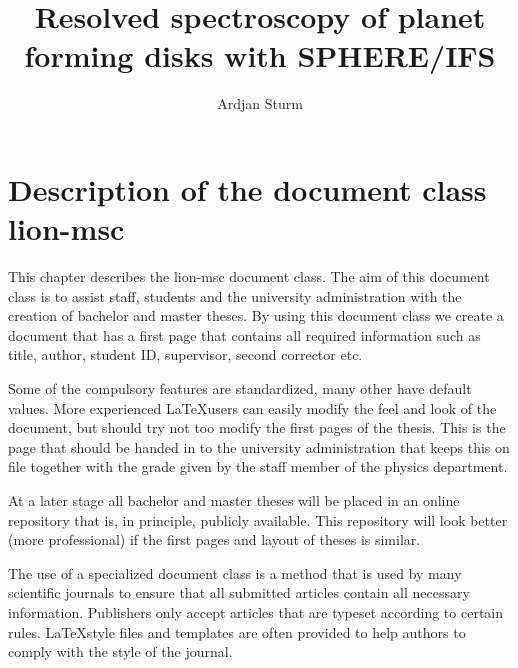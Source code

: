 \documentclass[twoside,single]{lion-msc}
\title{Resolved spectroscopy of planet forming disks with SPHERE/IFS}
\author{Ardjan Sturm}
\begin{document}

\maketitle

\tableofcontents
\cleardoublepage




\chapter{Description of the document class \textrm{lion-msc}}

This chapter describes the \textrm{lion-msc} document class. The aim of this document class is to assist staff, students and the university administration with the creation of bachelor and master theses. By using this document class we create a document that has a first page that contains all required information such as title, author, student ID, supervisor, second corrector etc.

Some of the compulsory features are standardized, many other have default values. More experienced \LaTeX users can easily modify the feel and look of the document, but should try not too modify the first pages of the thesis. This is the page that should be handed in to the university administration that keeps this on file together with the grade given by the staff member of the physics department.

At a later stage all bachelor and master theses will be placed in an online repository that is, in principle, publicly available. This repository will look better (more professional) if the first pages and layout of theses is similar.

The use of a specialized document class is a method that is used by many scientific journals to ensure that all submitted articles contain all necessary information. Publishers only accept articles that are typeset according to certain rules. \LaTeX style files and templates are often provided to help authors to comply with the style of the journal.
\end{document}
